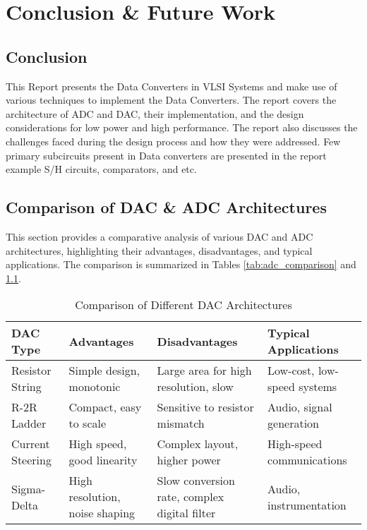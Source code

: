 \chapter{Conclusion \& Future Work}
\addborderb
\section{Conclusion}
This Report presents the Data Converters in VLSI Systems and make use of various techniques to implement the Data Converters. The report covers the architecture of ADC and DAC, their implementation, and the design considerations for low power and high performance. The report also discusses the challenges faced during the design process and how they were addressed.
Few primary subcircuits present in Data converters are presented in the report example S/H circuits, comparators, and etc. 
\section{Comparison of DAC \& ADC Architectures}
This section provides a comparative analysis of various DAC and ADC architectures, highlighting their advantages, disadvantages, and typical applications. The comparison is summarized in Tables \ref{tab:adc_comparison} and \ref{tab:dac_comparison}.
\begin{table}[h!]
\centering
\begin{tabular}{|p{2.8cm}|p{4cm}|p{4cm}|p{4cm}|}
\hline
\textbf{DAC Type} & \textbf{Advantages} & \textbf{Disadvantages} & \textbf{Typical Applications} \\
\hline
Resistor String & Simple design, monotonic & Large area for high resolution, slow & Low-cost, low-speed systems \\
\hline
R-2R Ladder & Compact, easy to scale & Sensitive to resistor mismatch & Audio, signal generation \\
\hline
Current Steering & High speed, good linearity & Complex layout, higher power & High-speed communications \\
\hline
Sigma-Delta & High resolution, noise shaping & Slow conversion rate, complex digital filter & Audio, instrumentation \\
\hline
\end{tabular}
\caption{Comparison of Different DAC Architectures}
\label{tab:dac_comparison}
\end{table}

